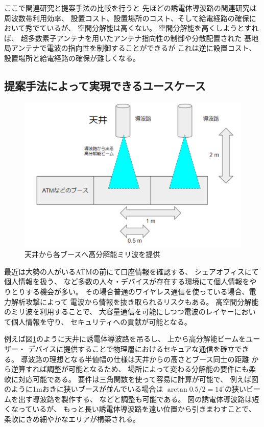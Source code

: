 \documentclass[technicalreport]{ieicej}
\begin{document}
ここで関連研究と提案手法の比較を行うと
先ほどの誘電体導波路の関連研究は周波数帯利用効率、
設置コスト、設置場所のコスト、そして給電経路の確保において秀でているが、
空間分解能は高くない。
空間分解能を高くしようとすれば、
超多数素子アンテナを用いたアンテナ指向性の制御や分散配置された
基地局アンテナで電波の指向性を制御することができるが
これは逆に設置コスト、設置場所と給電経路の確保が難しくなる。

\subsection{提案手法によって実現できるユースケース}

\begin{figure}[tb]
  \vspace{20mm}
  \begin{center}
    \includegraphics[bb=0 0 384 262, width=0.7\linewidth]{img/usecase.pdf}
    \caption{天井から各ブースへ高分解能ミリ波を提供}
    \label{fig:usecase}
  \end{center}
\end{figure}


最近は大勢の人がいるATMの前にて口座情報を確認する、
シェアオフィスにて個人情報を扱う、
など多数の人々・デバイスが存在する環境にて個人情報をやりとりする機会が多い。
その場合普通のワイヤレス通信を使っている場合、電力解析攻撃によって
電波から情報を抜き取られるリスクもある。
高空間分解能のミリ波を利用することで、
大容量通信を可能にしつつ電波のレイヤーにおいて個人情報を守り、
セキュリティへの貢献が可能となる。

例えば図\ref{fig:usecase}のように天井に誘電体導波路を吊るし、
上から高分解能ビームをユーザー・
デバイスに提供することで物理層におけるセキュアな通信を確立できる。
導波路の理想となる半値幅の仕様は天井からの高さとブース同士の距離
から逆算すれば調整が可能となるため、
場所によって変わる分解能の要件にも柔軟に対応可能である。
要件は三角関数を使って容易に計算が可能で、
例えば図のように1mおきに狭いブースが並んでいる場合は
$\arctan 0.5 / 2 = 14^{\circ}$の狭いビームを出す導波路を製作する、
などと調整も可能である。
図の誘電体導波路は短くなっているが、
もっと長い誘電体導波路を遠い位置から引きまわすことで、
柔軟にきめ細やかなエリアが構築される。
\end{document}
